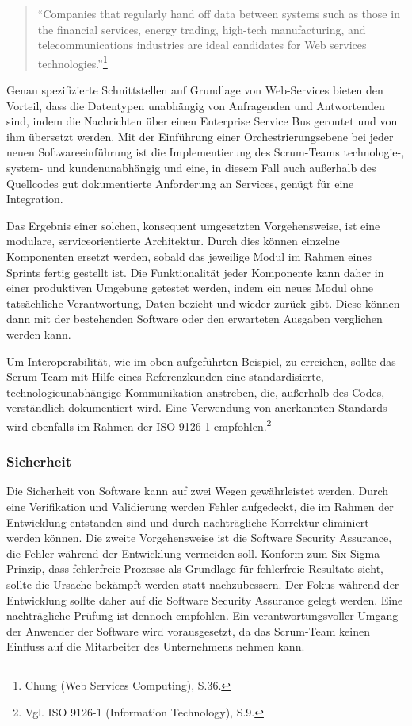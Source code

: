                 \begin{quote}
                    \enquote{Companies that regularly hand off data between systems such as those in the financial services, energy trading, high-tech manufacturing, and telecommunications industries are ideal candidates for Web services technologies.}\footnote{Chung (Web Services Computing), S.36.}
                \end{quote}

                Genau spezifizierte Schnittstellen auf Grundlage von Web-Services bieten den Vorteil, dass die Datentypen unabhängig von Anfragenden und Antwortenden sind, indem die Nachrichten über einen Enterprise Service Bus geroutet und von ihm übersetzt werden. Mit der Einführung einer Orchestrierungsebene bei jeder neuen Softwareeinführung ist die Implementierung des Scrum-Teams technologie-, system- und kundenunabhängig und eine, in diesem Fall auch außerhalb des Quellcodes gut dokumentierte Anforderung an Services, genügt für eine Integration.

                Das Ergebnis einer solchen, konsequent umgesetzten Vorgehensweise, ist eine modulare, serviceorientierte Architektur. Durch dies können einzelne Komponenten ersetzt werden, sobald das jeweilige Modul im Rahmen eines Sprints fertig gestellt ist. Die Funktionalität jeder Komponente kann daher in einer produktiven Umgebung getestet werden, indem ein neues Modul ohne tatsächliche Verantwortung, Daten bezieht und wieder zurück gibt. Diese können dann mit der bestehenden Software oder den erwarteten Ausgaben verglichen werden kann.

                Um Interoperabilität, wie im oben aufgeführten Beispiel, zu erreichen, sollte das Scrum-Team mit Hilfe eines Referenzkunden eine standardisierte, technologieunabhängige Kommunikation anstreben, die, außerhalb des Codes, verständlich dokumentiert wird. Eine Verwendung von anerkannten Standards wird ebenfalls im Rahmen der ISO 9126-1 empfohlen.\footnote{Vgl. ISO 9126-1 (Information Technology), S.9.}

            \subsubsection{Sicherheit}

                Die Sicherheit von Software kann auf zwei Wegen gewährleistet werden. Durch eine Verifikation und Validierung werden Fehler aufgedeckt, die im Rahmen der Entwicklung entstanden sind und durch nachträgliche Korrektur eliminiert werden können. Die zweite Vorgehensweise ist die Software Security Assurance, die Fehler während der Entwicklung vermeiden soll. Konform zum Six Sigma Prinzip, dass fehlerfreie Prozesse als Grundlage für fehlerfreie Resultate sieht, sollte die Ursache bekämpft werden statt nachzubessern. Der Fokus während der Entwicklung sollte daher auf die Software Security Assurance gelegt werden. Eine nachträgliche Prüfung ist dennoch empfohlen. Ein verantwortungsvoller Umgang der Anwender der Software wird vorausgesetzt, da das Scrum-Team keinen Einfluss auf die Mitarbeiter des Unternehmens nehmen kann.

